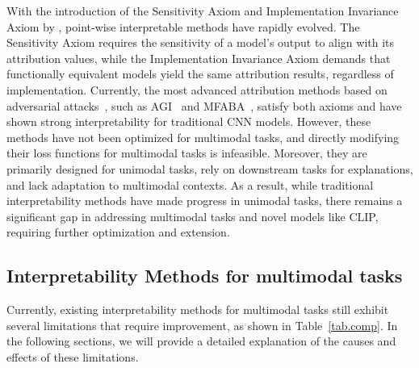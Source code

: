With the introduction of the Sensitivity Axiom and Implementation Invariance Axiom by \cite{sundararajan2017axiomatic}, point-wise interpretable methods have rapidly evolved. The Sensitivity Axiom requires the sensitivity of a model's output to align with its attribution values, while the Implementation Invariance Axiom demands that functionally equivalent models yield the same attribution results, regardless of implementation. Currently, the most advanced attribution methods based on adversarial attacks~\cite{jin2024benchmarking}, such as AGI~\citep{pan2021explaining} and MFABA~\citep{zhu2024mfaba}, satisfy both axioms and have shown strong interpretability for traditional CNN models. However, these methods have not been optimized for multimodal tasks, and directly modifying their loss functions for multimodal tasks is infeasible. Moreover, they are primarily designed for unimodal tasks, rely on downstream tasks for explanations, and lack adaptation to multimodal contexts. As a result, while traditional interpretability methods have made progress in unimodal tasks, there remains a significant gap in addressing multimodal tasks and novel models like CLIP, requiring further optimization and extension.

\subsection{Interpretability Methods for multimodal tasks}
Currently, existing interpretability methods for multimodal tasks still exhibit several limitations that require improvement, as shown in Table~\ref{tab.comp}. In the following sections, we will provide a detailed explanation of the causes and effects of these limitations.

